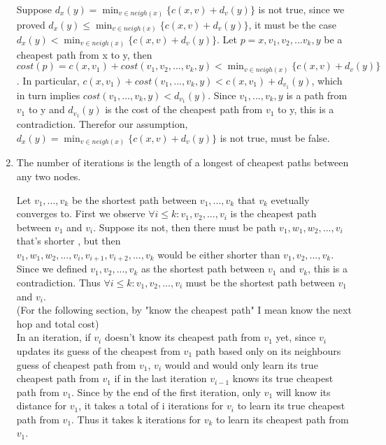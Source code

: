\documentclass[12pt]{article}
\begin{document}
\begin{enumerate}
        Suppose $d_x(y) = \min_{v \in neigh(x)}\{c(x,v) + d_v(y)\}$ is not true, since we proved
        $d_x(y) \leq \min_{v \in neigh(x)}\{c(x,v) + d_v(y)\}$, it must be the case 
        $d_x(y) < \min_{v \in neigh(x)}\{c(x,v) + d_v(y)\}$.
        Let $p=x,v_1,v_2,...v_k,y$ be a cheapest path from x to y, then  
        $cost(p) = c(x,v_1) + cost(v_1, v_2,...,v_k,y) < \min_{v \in neigh(x)}\{c(x,v) + d_v(y)\}$. 
        In particular, $c(x, v_1) + cost(v_1,...,v_k,y) < c(x, v_1) + d_{v_1}(y)$,
        which in turn implies $cost(v_1,...,v_k,y) < d_{v_1}(y)$.
        Since $v_1,...,v_k,y$ is a path from $v_1$ to y and $d_{v_1}(y)$ is the cost of the cheapest path from 
        $v_1$ to y, this is a contradiction. Therefor our assumption, $d_x(y) = \min_{v \in neigh(x)}\{c(x,v) + d_v(y)\}$ is not true,
        must be false.

	\item %

        The number of iterations is the length of a longest of cheapest paths between any two nodes.

        Let $v_1,...,v_k$ be the shortest path between $v_1,...,v_k$ that $v_k$ evetually converges to.  
        First we observe $\forall i \leq k: v_1, v_2, ..., v_i$ is the cheapest path between $v_1$ and $v_i$.
        Suppose its not, then there must be path $v_1,w_1,w_2,...,v_i$ that's shorter , but then \\
        $v_1,w_1,w_2,...,v_i,v_{i+1},v_{i+2},...,v_k$ would be either shorter than $v_1,v_2,...,v_k$.
        Since we defined $v_1,v_2,...,v_k$ as the shortest path between $v_1$ and $v_k$, this is a
        contradiction. Thus $\forall i \leq k: v_1, v_2, ..., v_i$ must be the shortest path between
        $v_1$ and $v_i$. \\

        (For the following section, by "know the cheapest path" I mean know the next hop and total cost) \\

        In an iteration, if $v_i$ doesn't know its cheapest path from $v_1$ yet, since $v_i$ updates its guess of the cheapest
        from $v_1$ path based only on its neighbours guess of cheapest path from $v_1$,
        $v_i$ would and would only learn its true cheapest path from $v_1$ if in the last 
        iteration $v_{i-1}$ knows its true cheapest path from $v_1$. Since by the end of the first iteration, only
        $v_1$ will know its distance for $v_1$, it takes a total of i iterations for $v_i$ to learn
        its true cheapest path from $v_1$. Thus it takes k iterations for $v_k$ to learn its cheapest path
        from $v_1$. \\


\end{enumerate}
\end{document}
